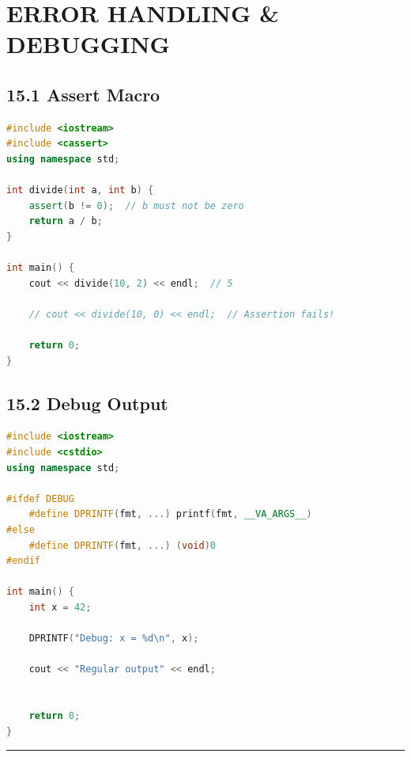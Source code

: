 \hypertarget{error-handling-debugging}{%
\chapter{ERROR HANDLING \& DEBUGGING}\label{error-handling-debugging}}

\hypertarget{assert-macro}{%
\section{15.1 Assert Macro}\label{assert-macro}}

\begin{lstlisting}[language={C++}]
#include <iostream>
#include <cassert>
using namespace std;

int divide(int a, int b) {
    assert(b != 0);  // b must not be zero
    return a / b;
}

int main() {
    cout << divide(10, 2) << endl;  // 5
    
    // cout << divide(10, 0) << endl;  // Assertion fails!
    
    return 0;
}
\end{lstlisting}

\hypertarget{debug-output}{%
\section{15.2 Debug Output}\label{debug-output}}

\begin{lstlisting}[language={C++}]
#include <iostream>
#include <cstdio>
using namespace std;

#ifdef DEBUG
    #define DPRINTF(fmt, ...) printf(fmt, __VA_ARGS__)
#else
    #define DPRINTF(fmt, ...) (void)0
#endif

int main() {
    int x = 42;
    
    DPRINTF("Debug: x = %d\n", x);
    
    cout << "Regular output" << endl;
    
    
    return 0;
}
\end{lstlisting}

\begin{center}\rule{0.5\linewidth}{0.5pt}\end{center}

